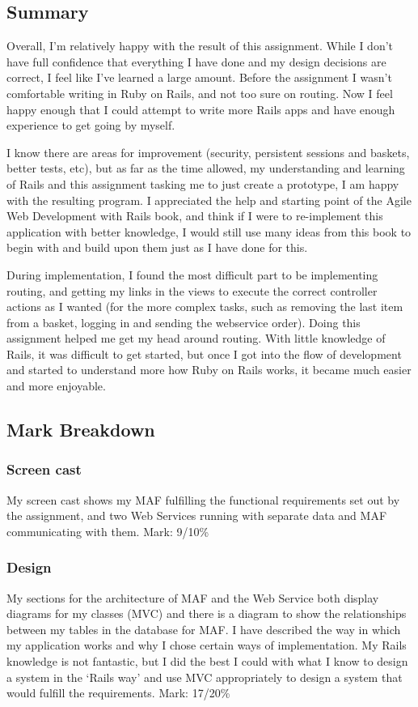 \documentclass[12pt]{article}
\begin{document}
\subsection{Summary}
Overall, I'm relatively happy with the result of this assignment. While I don't have full confidence that everything I have done and my design decisions are correct, I feel like I've learned a large amount. Before the assignment I wasn't comfortable writing in Ruby on Rails, and not too sure on routing. Now I feel happy enough that I could attempt to write more Rails apps and have enough experience to get going by myself.

I know there are areas for improvement (security, persistent sessions and baskets, better tests, etc), but as far as the time allowed, my understanding and learning of Rails and this assignment tasking me to just create a prototype, I am happy with the resulting program. I appreciated the help and starting point of the Agile Web Development with Rails\cite{railsbook} book, and think if I were to re-implement this application with better knowledge, I would still use many ideas from this book to begin with and build upon them just as I have done for this.

During implementation, I found the most difficult part to be implementing routing, and getting my links in the views to execute the correct controller actions as I wanted (for the more complex tasks, such as removing the last item from a basket, logging in and sending the webservice order). Doing this assignment helped me get my head around routing. With little knowledge of Rails, it was difficult to get started, but once I got into the flow of development and started to understand more how Ruby on Rails works, it became much easier and more enjoyable. 

\subsection{Mark Breakdown}
\subsubsection{Screen cast}
My screen cast shows my MAF fulfilling the functional requirements set out by the assignment, and two Web Services running with separate data and MAF communicating with them.
\newline
Mark: 9/10\%

\subsubsection{Design}
My sections for the architecture of MAF and the Web Service both display diagrams for my classes (MVC) and there is a diagram to show the relationships between my tables in the database for MAF. I have described the way in which my application works and why I chose certain ways of implementation. My Rails knowledge is not fantastic, but I did the best I could with what I know to design a system in the `Rails way' and use MVC appropriately to design a system that would fulfill the requirements.
\newline
Mark: 17/20\%
\end{document}
